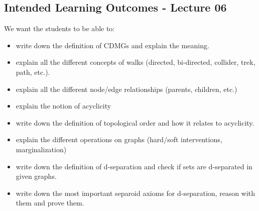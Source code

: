 \subsection*{Intended Learning Outcomes - Lecture 06}

We want the students to be able to:
\begin{itemize}
\item write down the definition of CDMGs and explain the meaning.
\item explain all the different concepts of walks (directed, bi-directed, collider, trek, path, etc.).
\item explain all the different node/edge relationships (parents, children, etc.)
\item explain the notion of acyclicity
\item write down the definition of topological order and how it relates to acyclicity.
\item explain the different operations on graphs (hard/soft interventions, marginalization)
\item write down the definition of d-separation and check if sets are d-separated in given graphs.
\item write down the most important separoid axioms for d-separation, reason with them and prove them.
\end{itemize}


